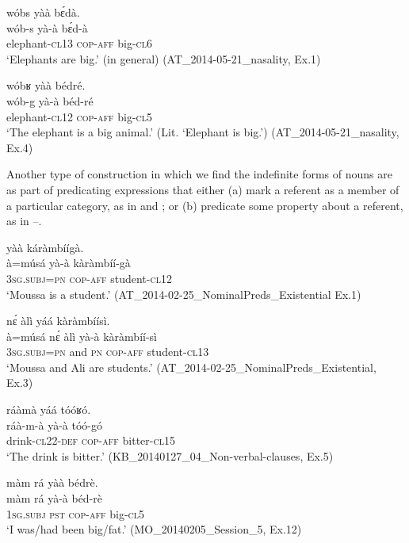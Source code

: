 \documentclass[output=paper]{langsci/langscibook}
\begin{document}
\ea\label{ex:teo:32}
\glll wóbs yàà b\'ɛdà.\\
 wób-s yà-à b\'ɛd-à\\
 elephant-\textsc{cl13} \textsc{cop-aff} big-\textsc{cl6}\\
\glt ‘Elephants are big.’ (in general) (AT\_2014-05-21\_nasality, Ex.1)
\z

\ea\label{ex:teo:33}
\glll wóbʁ yàà bédré.\\
 wób-g yà-à béd-ré\\
elephant-\textsc{cl12} \textsc{cop-aff} big-\textsc{cl5}\\
\glt ‘The elephant is a big animal.’ (Lit. ‘Elephant is big.’) (AT\_2014-05-21\_nasality, Ex.4)
\z

Another type of construction in which we find the indefinite forms of nouns are as part of predicating expressions that either (a) mark a referent as a member of a particular category, as in  and ; or (b) predicate some property about a referent, as in –.

\ea\label{ex:teo:34}
 yàà káràmbíígà.\\
  à=músá yà-à kàràmbíí-gà\\
 \textsc{3sg.subj=pn} \textsc{cop-aff} student-\textsc{cl12}\\
\glt ‘Moussa is a student.’ (AT\_2014-02-25\_NominalPreds\_Existential Ex.1)
\z

\ea\label{ex:teo:35}
 n\'ɛ àlì yáá kàràmbíísì.\\
 à=músá n\'ɛ àlì yà-à kàràmbíí-sì\\
\textsc{3sg.subj=pn} and \textsc{pn}  \textsc{cop-aff} student-\textsc{cl}13\\
\glt ‘Moussa and Ali are students.’ (AT\_2014-02-25\_NominalPreds\_Existential, Ex.3)
\z

\ea\label{ex:teo:36}
\glll ráàmà yáá tóóʁó.\\
 ráà-m-à yà-à tóó-gó\\
drink-\textsc{cl22-def} \textsc{cop-aff} bitter-\textsc{cl15}\\
\glt ‘The drink is bitter.’ (KB\_20140127\_04\_Non-verbal-clauses, Ex.5)
\z

\ea\label{ex:teo:37}
\glll màm rá yàà bédrè.\\
 màm rá yà-à béd-rè\\
\textsc{1sg.subj} \textsc{pst} \textsc{cop-aff} big-\textsc{cl5}\\
\glt ‘I was/had been big/fat.’ (MO\_20140205\_Session\_5, Ex.12)
\z
\end{document}
